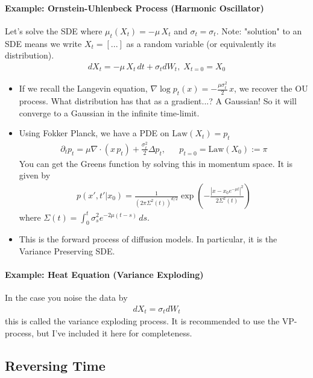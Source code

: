 \paragraph{Example: Ornstein-Uhlenbeck Process (Harmonic Oscillator)}
Let's solve the SDE where $\mu_t(X_t) = - \mu \, X_t$ and $\sigma_t = \sigma_t$. Note: "solution" to an SDE means we write $X_t = [...]$ as a random variable (or equivalently its distribution).
\begin{align}
	dX_t = - \mu \, X_t \, dt + \sigma_t dW_t, \; X_{t=0} = X_0
\end{align}
\begin{itemize}
	\item If we recall the Langevin equation, $\nabla \log p_t(x) = - \frac{\mu \sigma^2_t}{2} \, x$, we recover the OU process. What distribution has that as a gradient...? A Gaussian! So it will converge to a Gaussian in the infinite time-limit.
	\item Using Fokker Planck, we have a PDE on $\text{Law}(X_t) = p_t$
	\begin{align}
		\partial_t p_t = \mu \nabla \cdot (x\, p_t) + \frac{\sigma^2_t}{2}\Delta  p_t, && p_{t=0} = \text{Law}(X_0) := \pi
	\end{align}
	You can get the Greens function by solving this in momentum space. It is given by
	\begin{align}
		p(x', t' | x_0) = \frac{1}{(2\pi \Sigma^2(t))^{d/2}} \exp \left( -\frac{|x-  x_0 e^{-\mu t}|^2}{2 \Sigma^2(t)} \right)
	\end{align}
	where $\Sigma(t) = \int_0^t \sigma_s^2 e^{-2\mu(t-s)}\,ds$.
	\item This is the forward process of diffusion models. In particular, it is the Variance Preserving SDE.
\end{itemize}
\paragraph{Example: Heat Equation (Variance Exploding)}
In the case you noise the data by
\begin{align}
	dX_t = \sigma_t dW_t
\end{align}
this is called the variance exploding process. It is recommended to use the VP-process, but I've included it here for completeness.

\subsection{Reversing Time}

